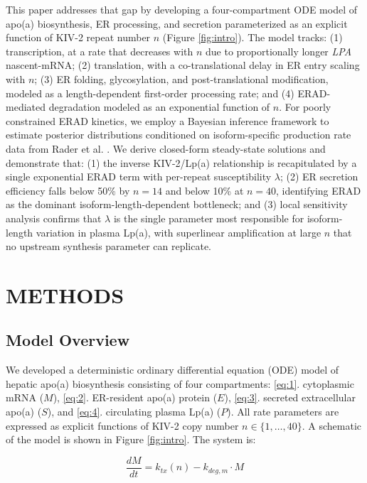 \documentclass[12pt,letterpaper]{article}
\begin{document}
This paper addresses that gap by developing a four-compartment ODE model of apo(a) biosynthesis, ER processing, and secretion parameterized as an explicit function of KIV-2 repeat number $n$ (Figure \ref{fig:intro}). The model tracks: (1) transcription, at a rate that decreases with $n$ due to proportionally longer \textit{LPA} nascent-mRNA; (2) translation, with a co-translational delay in ER entry scaling with $n$; (3) ER folding, glycosylation, and post-translational modification, modeled as a length-dependent first-order processing rate; and (4) ERAD-mediated degradation modeled as an exponential function of $n$. For poorly constrained ERAD kinetics, we employ a Bayesian inference framework to estimate posterior distributions conditioned on isoform-specific production rate data from Rader et al. \citep{rader1994inverse}. We derive closed-form steady-state solutions and demonstrate that: (1) the inverse KIV-2/Lp(a) relationship is recapitulated by a single exponential ERAD term with per-repeat susceptibility $\lambda$; (2) ER secretion efficiency falls below 50\% by $n = 14$ and below 10\% at $n = 40$, identifying ERAD as the dominant isoform-length-dependent bottleneck; and (3) local sensitivity analysis confirms that $\lambda$ is the single parameter most responsible for isoform-length variation in plasma Lp(a), with superlinear amplification at large $n$ that no upstream synthesis parameter can replicate.

\section{METHODS}

\subsection{Model Overview}
\label{sec:overview}

We developed a deterministic ordinary differential equation (ODE) model of hepatic apo(a) biosynthesis consisting of four compartments: \ref{eq:1}. cytoplasmic mRNA ($M$), \ref{eq:2}. ER-resident apo(a) protein ($E$), \ref{eq:3}. secreted extracellular apo(a) ($S$), and \ref{eq:4}. circulating plasma Lp(a) ($P$). All rate parameters are expressed as explicit functions of KIV-2 copy number $n \in \{1, \ldots, 40\}$. A schematic of the model is shown in Figure \ref{fig:intro}. The system is:

\begin{equation}\label{eq:1}
    \frac{dM}{dt} = k_{tx}(n) - k_{deg,m} \cdot M
\end{equation}
\end{document}
